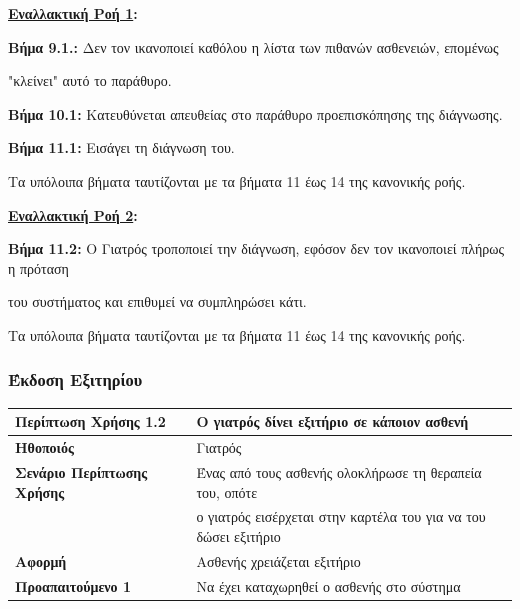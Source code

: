 \documentclass{article}
\newcommand\T{\rule{0pt}{2.6ex}}       %
\newcommand\B{\rule[-1.2ex]{0pt}{0pt}}
\begin{document}
  \textbf{\underline{Εναλλακτική Ροή 1}:}  \vspace{0.2cm}
\par \textbf{Βήμα 9.1.:} Δεν τον ικανοποιεί καθόλου η λίστα των πιθανών ασθενειών, επομένως \par "κλείνει" αυτό το παράθυρο. \vspace{0.1cm}
\par \textbf{Βήμα 10.1:} Κατευθύνεται απευθείας στο παράθυρο προεπισκόπησης της διάγνωσης. \vspace{0.1cm}
\par \textbf{Βήμα 11.1:} Εισάγει τη διάγνωση του. \vspace{0.1cm}

\par Τα υπόλοιπα βήματα ταυτίζονται με τα βήματα 11 έως 14 της κανονικής ροής.

\vspace{0.2cm}

\textbf{\underline{Εναλλακτική Ροή 2}:}  \vspace{0.2cm}
\par \textbf{Βήμα 11.2:} Ο Γιατρός τροποποιεί την διάγνωση, εφόσον δεν τον ικανοποιεί πλήρως η πρόταση \par του συστήματος και επιθυμεί να συμπληρώσει κάτι. \vspace{0.1cm}

\par Τα υπόλοιπα βήματα ταυτίζονται με τα βήματα 11 έως 14 της κανονικής ροής.\vspace{0.1cm}

\newpage

 \subsubsection{Έκδοση Εξιτηρίου}
 
 \begin{center}
     \begin{tabular}{|l|l|}
     \hline
      \textbf{Περίπτωση Χρήσης 1.2} & Ο γιατρός δίνει εξιτήριο σε κάποιον ασθενή \T\B \\ 
      \hline
      \textbf{Ηθοποιός} & Γιατρός \T\B \\
      \hline
      \textbf{Σενάριο Περίπτωσης Χρήσης} & Ένας από τους ασθενής ολοκλήρωσε τη θεραπεία του, οπότε \T\\& ο γιατρός εισέρχεται στην καρτέλα του για να του δώσει εξιτήριο \B \\
      \hline
      \textbf{Αφορμή} & Ασθενής χρειάζεται εξιτήριο \T\B \\
      \hline
      \textbf{Προαπαιτούμενο 1} & Να έχει καταχωρηθεί ο ασθενής στο σύστημα \T\B \\
      \hline
     \end{tabular}
 \end{center}
 
\end{document}
